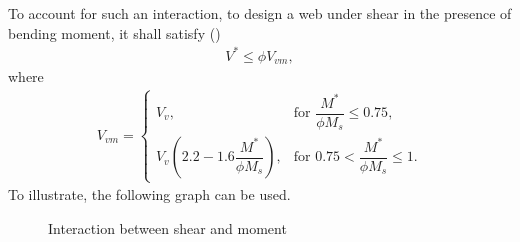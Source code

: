 To account for such an interaction, to design a web under shear in the presence of bending moment, it shall satisfy ()
\begin{gather}
V^*\leqslant\phi{}V_{vm},
\end{gather}
where
\begin{gather}
V_{vm}=\left\{
\begin{array}{ll}
V_v,&\text{for~}\dfrac{M^*}{\phi{}M_s}\leqslant0.75,\\
V_v\left(2.2-1.6\dfrac{M^*}{\phi{}M_s}\right),&\text{for~}0.75<\dfrac{M^*}{\phi{}M_s}\leqslant1.
\end{array}
\right.
\end{gather}
To illustrate, the following graph can be used.
\begin{figure}[H]
\centering\caption{Interaction between shear and moment}
\end{figure}

